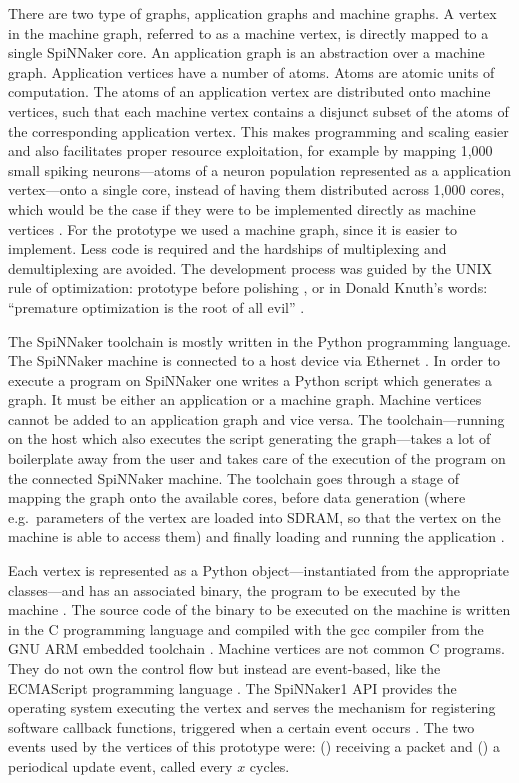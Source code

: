 \documentclass[]{article}
\begin{document}
There are two type of graphs, application graphs and machine graphs.
A vertex in the machine graph, referred to as a machine vertex, is
directly mapped to a single SpiNNaker core.
An application graph is an abstraction over a machine graph.
Application vertices have a number of atoms.
Atoms are atomic units of computation.
The atoms of an application vertex are distributed onto machine
vertices, such that each machine vertex contains a disjunct subset
of the atoms of the corresponding application vertex.
This makes programming and scaling easier and also facilitates proper
resource exploitation, for example by mapping 1,000 small spiking
neurons---atoms of a neuron population represented as a application
vertex---onto a single core, instead of having them distributed across
1,000 cores, which would be the case if they were to be implemented
directly as machine vertices \citep{furber_et_al_2020}.
For the prototype we used a machine graph, since it is easier to
implement.
Less code is required and the hardships of multiplexing and
demultiplexing are avoided.
The development process was guided by the UNIX rule of optimization:
prototype before polishing \citep{raymond_2003}, or in Donald Knuth's
words: ``premature optimization is the root of all evil''
\citep{knuth_1974}.

The SpiNNaker toolchain is mostly written in the Python programming
language.
The SpiNNaker machine is connected to a host device via Ethernet
\citep{rowley_et_al_2019}.
In order to execute a program on SpiNNaker one writes a Python
script which generates a graph.
It must be either an application or a machine graph.
Machine vertices cannot be added to an application graph and vice
versa.
The toolchain---running on the host which also executes the script
generating the graph---takes a lot of boilerplate away from the user
and takes care of the execution of the program on the connected
SpiNNaker machine.
The toolchain goes through a stage of mapping the graph onto the
available cores, before data generation (where e.g.\ parameters of the
vertex are loaded into SDRAM, so that the vertex on the machine is
able to access them) and finally loading and running the
application \citep{furber_et_al_2020}.

Each vertex is represented as a Python object---instantiated from the
appropriate classes---and has an associated binary, the program to
be executed by the machine \citep{furber_et_al_2020}.
The source code of the binary to be executed on the machine is written
in the C programming language and compiled with the gcc compiler from
the GNU ARM embedded toolchain \citep{arm_2020, rowley_et_al_2019}.
Machine vertices are not common C programs.
They do not own the control flow but instead are event-based, like
the ECMAScript programming language \citep{ecma_2020}.
The SpiNNaker1 API provides the operating system executing the vertex
and serves the mechanism for registering software callback functions,
triggered when a certain event occurs \citep{furber_et_al_2020}.
The two events used by the vertices of this prototype were:
() receiving a packet and () a
periodical update event, called every $x$ cycles.
\end{document}
